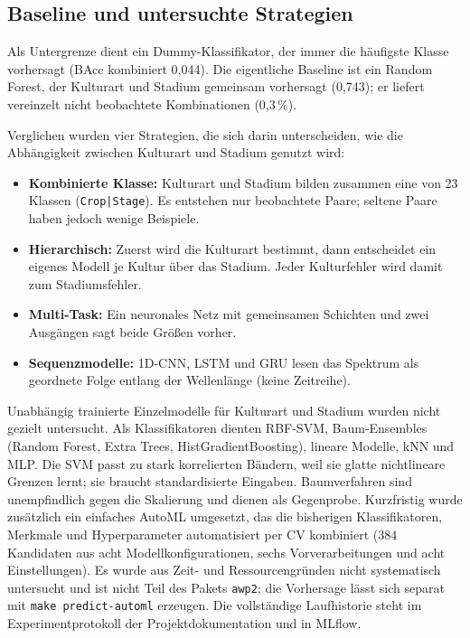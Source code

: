 \documentclass[11pt,a4paper,titlepage]{article}
\begin{document}
\subsection{Baseline und untersuchte Strategien}

Als Untergrenze dient ein Dummy-Klassifikator, der immer die h\"aufigste Klasse
vorhersagt (BAcc kombiniert 0,044). Die eigentliche Baseline ist ein Random
Forest, der Kulturart und Stadium gemeinsam vorhersagt (0,743); er liefert
vereinzelt nicht beobachtete Kombinationen (0,3\,\%).

Verglichen wurden vier Strategien, die sich darin unterscheiden, wie die
Abh\"angigkeit zwischen Kulturart und Stadium genutzt wird:

\begin{itemize}
	\item \textbf{Kombinierte Klasse:} Kulturart und Stadium bilden zusammen eine
		von 23 Klassen (\texttt{Crop|Stage}). Es entstehen nur beobachtete Paare;
		seltene Paare haben jedoch wenige Beispiele.
	\item \textbf{Hierarchisch:} Zuerst wird die Kulturart bestimmt, dann entscheidet
		ein eigenes Modell je Kultur \"uber das Stadium. Jeder Kulturfehler wird
		damit zum Stadiumsfehler.
	\item \textbf{Multi-Task:} Ein neuronales Netz mit gemeinsamen Schichten und
		zwei Ausg\"angen sagt beide Gr\"o\ss en vorher.
	\item \textbf{Sequenzmodelle:} 1D-CNN, LSTM und GRU lesen das Spektrum als
		geordnete Folge entlang der Wellenl\"ange (keine Zeitreihe).
\end{itemize}

Unabh\"angig trainierte Einzelmodelle f\"ur Kulturart und Stadium wurden nicht
gezielt untersucht. Als Klassifikatoren dienten RBF-SVM, Baum-Ensembles (Random Forest,
Extra Trees, HistGradientBoosting), lineare Modelle, kNN und MLP. Die SVM passt zu
stark korrelierten B\"andern, weil sie glatte nichtlineare Grenzen lernt; sie
braucht standardisierte Eingaben. Baumverfahren sind unempfindlich gegen die
Skalierung und dienen als Gegenprobe. Kurzfristig wurde zus\"atzlich ein
einfaches AutoML umgesetzt, das die bisherigen Klassifikatoren,
Merkmale und Hyperparameter automatisiert per CV kombiniert (384 Kandidaten aus
acht Modellkonfigurationen, sechs Vorverarbeitungen und acht Einstellungen).
Es wurde aus Zeit- und Ressourcengr\"unden nicht systematisch untersucht und
ist nicht Teil des Pakets \texttt{awp2}; die Vorhersage l\"asst sich separat mit
\texttt{make predict-automl} erzeugen. Die vollst\"andige Laufhistorie steht im
Experimentprotokoll der Projektdokumentation und in MLflow.
\end{document}
